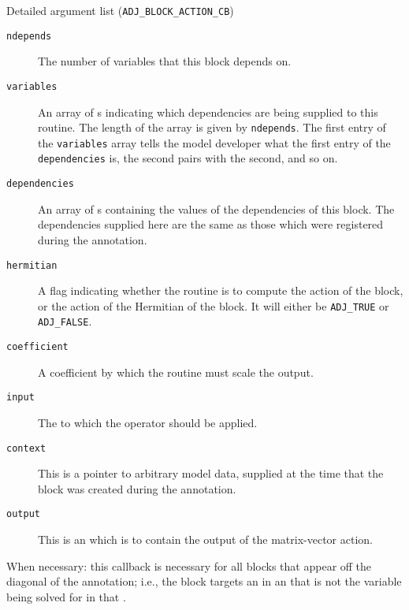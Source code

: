 \begin{boxwithtitle}{Detailed argument list (\texttt{ADJ_BLOCK_ACTION_CB})}
\begin{description}
\item[\texttt{ndepends}] The number of variables that this block depends on.
\item[\texttt{variables}] An array of s indicating which dependencies are being supplied to this routine. The length of the
array is given by \texttt{ndepends}. The first entry of the \texttt{variables} array
tells the model developer what the first entry of the \texttt{dependencies} is, the second pairs with the second, and so on.
\item[\texttt{dependencies}] An array of s containing the values of the dependencies of this block. The dependencies supplied
here are the same as those which were registered during the annotation.
\item[\texttt{hermitian}] A flag indicating whether the routine is to compute the action of the block, or the action of the Hermitian of the
block. It will either be \texttt{ADJ_TRUE} or \texttt{ADJ_FALSE}.
\item[\texttt{coefficient}] A coefficient by which the routine must scale the output.
\item[\texttt{input}] The  to which the operator should be applied.
\item[\texttt{context}] This is a pointer to arbitrary model data, supplied at the time that the block was created during the annotation.
\item[\texttt{output}] This is an  which is to contain the output of the matrix-vector action.
\end{description}
\end{boxwithtitle}

When necessary: this callback is necessary for all blocks that appear off the diagonal of the annotation; i.e., the block
targets an  in an  that is not the variable being solved for in that
.

